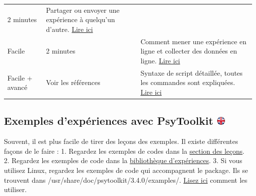 \documentclass[
]{book}
\begin{document}
\begin{longtable}[]{@{}lll@{}}
\begin{minipage}[t]{0.13\columnwidth}
2 minutes\strut
\end{minipage} & \begin{minipage}[t]{0.67\columnwidth}\raggedright
Partager ou envoyer une expérience à quelqu'un d'autre. \protect\hyperlink{s4-4}{Lire ici}\strut
\end{minipage}\tabularnewline
\begin{minipage}[t]{0.11\columnwidth}\raggedright
Facile\strut
\end{minipage} & \begin{minipage}[t]{0.13\columnwidth}\raggedright
2 minutes\strut
\end{minipage} & \begin{minipage}[t]{0.67\columnwidth}\raggedright
Comment mener une expérience en ligne et collecter des données en ligne. \protect\hyperlink{s4-5}{Lire ici}\strut
\end{minipage}\tabularnewline
\begin{minipage}[t]{0.11\columnwidth}\raggedright
Facile + avancé\strut
\end{minipage} & \begin{minipage}[t]{0.13\columnwidth}\raggedright
Voir les références\strut
\end{minipage} & \begin{minipage}[t]{0.67\columnwidth}\raggedright
Syntaxe de script détaillée, toutes les commandes sont expliquées. \protect\hyperlink{s5}{Lire ici}\strut
\end{minipage}\tabularnewline
\bottomrule
\end{longtable}

\hypertarget{exemples-dexpuxe9riences-avec-psytoolkit}{%
\subsection[Exemples d'expériences avec PsyToolkit ]{\texorpdfstring{Exemples d'expériences avec PsyToolkit \href{https://www.psytoolkit.org/doc3.4.0/\#_experiments_and_surveys}{\protect\includegraphics{img/ukflag.png}}}{Exemples d'expériences avec PsyToolkit }}\label{exemples-dexpuxe9riences-avec-psytoolkit}}

Souvent, il est plus facile de tirer des leçons des exemples. Il existe différentes façons de le faire :
1. Regardez les exemples de codes dans la \href{https://www.psytoolkit.org/lessons/\#lessons4}{section des leçons}.
2. Regardez les exemples de code dans la \href{https://www.psytoolkit.org/experiment-library}{bibliothèque d'expériences}.
3. Si vous utilisez Linux, regardez les exemples de code qui accompagnent le package. Ils se trouvent dans /usr/share/doc/psytoolkit/3.4.0/examples/. \href{https://www.psytoolkit.org/linux.html\#local_examples}{Lisez ici} comment les utiliser.
\end{document}
